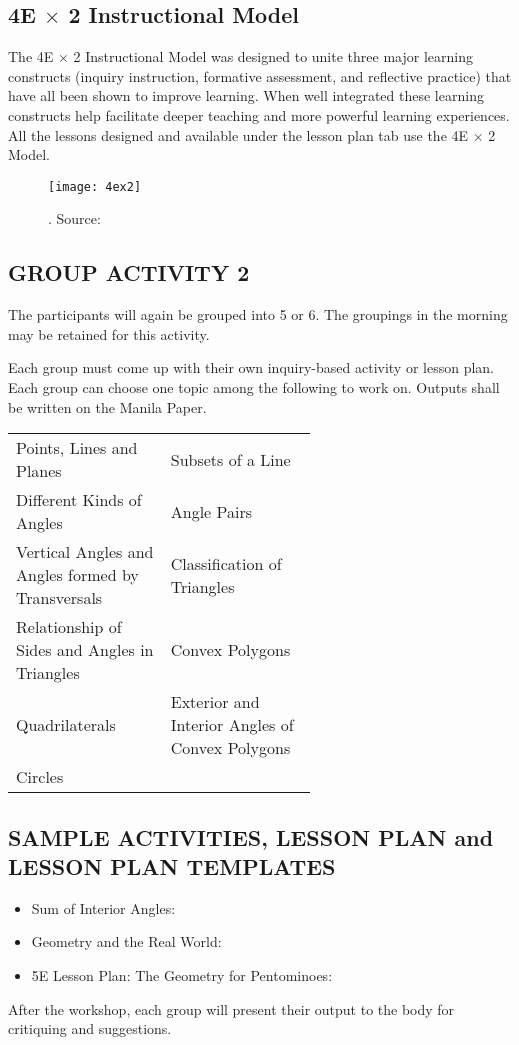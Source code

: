\subsection*{4E $\times$ 2 Instructional Model}
The 4E $\times$ 2 Instructional Model
was designed to unite three major
learning constructs (inquiry instruction,
formative assessment, and reflective
practice) that have all been shown to
improve learning. When well integrated
these learning constructs help facilitate
deeper teaching and more powerful
learning experiences. All the lessons
designed and available under the lesson
plan tab use the 4E $\times$ 2 Model.
\begin{figure}[!h]
\centering
\texttt{[image: 4ex2]}
\caption[$4\mathrm{E}\times 2$ Instructional Model]{. Source: }
\label{chap8fig:6}
\end{figure}
\subsection*{GROUP ACTIVITY 2}
The participants will again be grouped into 5 or 6. The groupings in the morning may be
retained for this activity.

Each group must come up with their own inquiry-based activity or lesson plan. Each group can
choose one topic among the following to work on. Outputs shall be written on the Manila Paper.

\begin{center}
\begin{tabular}{p{0.3\linewidth}p{0.3\linewidth}}
\hline 
Points, Lines and Planes & Subsets of a Line\\
Different Kinds of Angles & Angle Pairs\\
Vertical Angles and Angles formed by Transversals & Classification of Triangles\\
Relationship of Sides and Angles in Triangles & Convex Polygons\\
Quadrilaterals & Exterior and Interior Angles of Convex Polygons\\
Circles & \\
\hline 
\end{tabular}
\end{center}
\subsection*{SAMPLE ACTIVITIES, LESSON PLAN and LESSON PLAN TEMPLATES}
\begin{itemize}
\item Sum of Interior Angles: 
\item Geometry and the Real World: 
\item 5E Lesson Plan: The Geometry for Pentominoes: 
\end{itemize}
After the workshop, each group will present their output to the body for critiquing
and suggestions.
